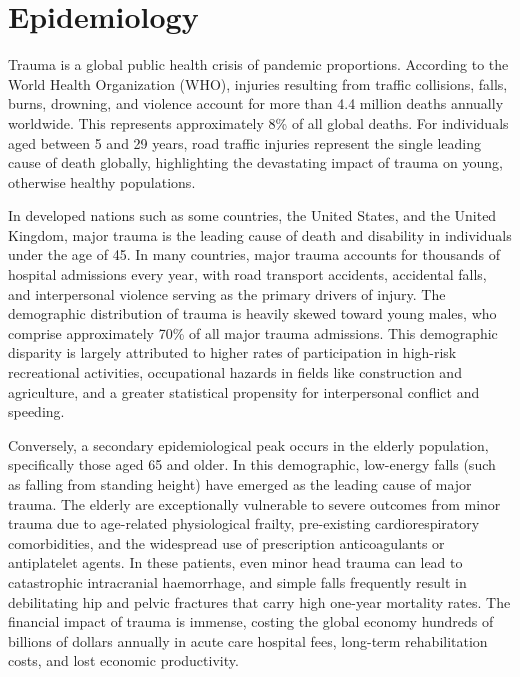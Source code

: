 \section*{Epidemiology}
Trauma is a global public health crisis of pandemic proportions. According to the World Health Organization (WHO), injuries resulting from traffic collisions, falls, burns, drowning, and violence account for more than 4.4 million deaths annually worldwide. This represents approximately 8\% of all global deaths. For individuals aged between 5 and 29 years, road traffic injuries represent the single leading cause of death globally, highlighting the devastating impact of trauma on young, otherwise healthy populations.

In developed nations such as some countries, the United States, and the United Kingdom, major trauma is the leading cause of death and disability in individuals under the age of 45. In many countries, major trauma accounts for thousands of hospital admissions every year, with road transport accidents, accidental falls, and interpersonal violence serving as the primary drivers of injury. The demographic distribution of trauma is heavily skewed toward young males, who comprise approximately 70\% of all major trauma admissions. This demographic disparity is largely attributed to higher rates of participation in high-risk recreational activities, occupational hazards in fields like construction and agriculture, and a greater statistical propensity for interpersonal conflict and speeding.

Conversely, a secondary epidemiological peak occurs in the elderly population, specifically those aged 65 and older. In this demographic, low-energy falls (such as falling from standing height) have emerged as the leading cause of major trauma. The elderly are exceptionally vulnerable to severe outcomes from minor trauma due to age-related physiological frailty, pre-existing cardiorespiratory comorbidities, and the widespread use of prescription anticoagulants or antiplatelet agents. In these patients, even minor head trauma can lead to catastrophic intracranial haemorrhage, and simple falls frequently result in debilitating hip and pelvic fractures that carry high one-year mortality rates. The financial impact of trauma is immense, costing the global economy hundreds of billions of dollars annually in acute care hospital fees, long-term rehabilitation costs, and lost economic productivity.

